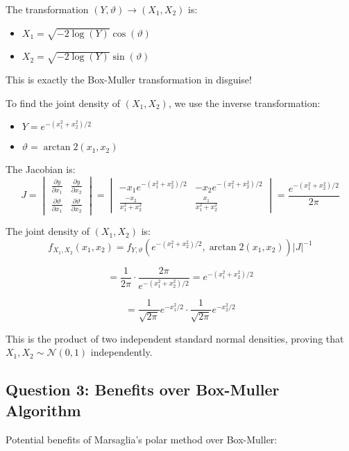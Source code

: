 The transformation $(Y, \vartheta) \to (X_1, X_2)$ is:
\begin{itemize}
    \item $X_1 = \sqrt{-2\log(Y)} \cos(\vartheta)$
    \item $X_2 = \sqrt{-2\log(Y)} \sin(\vartheta)$
\end{itemize}

This is exactly the Box-Muller transformation in disguise! 

To find the joint density of $(X_1, X_2)$, we use the inverse transformation:
\begin{itemize}
    \item $Y = e^{-(x_1^2 + x_2^2)/2}$
    \item $\vartheta = \arctan2(x_1, x_2)$
\end{itemize}

The Jacobian is:
$$J = \begin{vmatrix}
\frac{\partial y}{\partial x_1} & \frac{\partial y}{\partial x_2} \\
\frac{\partial \vartheta}{\partial x_1} & \frac{\partial \vartheta}{\partial x_2}
\end{vmatrix} = \begin{vmatrix}
-x_1 e^{-(x_1^2 + x_2^2)/2} & -x_2 e^{-(x_1^2 + x_2^2)/2} \\
\frac{-x_2}{x_1^2 + x_2^2} & \frac{x_1}{x_1^2 + x_2^2}
\end{vmatrix} = \frac{e^{-(x_1^2 + x_2^2)/2}}{2\pi}$$

The joint density of $(X_1, X_2)$ is:
$$f_{X_1,X_2}(x_1, x_2) = f_{Y,\vartheta}(e^{-(x_1^2 + x_2^2)/2}, \arctan2(x_1, x_2)) |J|^{-1}$$

$$= \frac{1}{2\pi} \cdot \frac{2\pi}{e^{-(x_1^2 + x_2^2)/2}} = e^{-(x_1^2 + x_2^2)/2}$$

$$= \frac{1}{\sqrt{2\pi}} e^{-x_1^2/2} \cdot \frac{1}{\sqrt{2\pi}} e^{-x_2^2/2}$$

This is the product of two independent standard normal densities, proving that $X_1, X_2 \sim \mathcal{N}(0,1)$ independently.

\subsection*{Question 3: Benefits over Box-Muller Algorithm}

Potential benefits of Marsaglia's polar method over Box-Muller:

